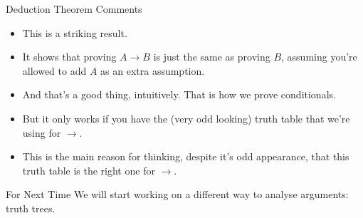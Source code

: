 \documentclass[
  ignorenonframetext,
]{beamer}
\providecommand{\tightlist}{%
  \setlength{\itemsep}{0pt}\setlength{\parskip}{0pt}}
\renewcommand{\,}{\text{, }}
\begin{document}
\begin{frame}{Deduction Theorem Comments}
\protect\hypertarget{deduction-theorem-comments}{}
\begin{itemize}
\tightlist
\item
  This is a striking result.
\item
  It shows that proving \(A \rightarrow B\) is just the same as proving
  \(B\), assuming you're allowed to add \(A\) as an extra assumption.
\item
  And that's a good thing, intuitively. That is how we prove
  conditionals.
\item
  But it only works if you have the (very odd looking) truth table that
  we're using for \(\rightarrow\).
\item
  This is the main reason for thinking, despite it's odd appearance,
  that this truth table is the right one for \(\rightarrow\).
\end{itemize}
\end{frame}

\begin{frame}{For Next Time}
\protect\hypertarget{for-next-time}{}
We will start working on a different way to analyse arguments: truth
trees.
\end{frame}
\end{document}
